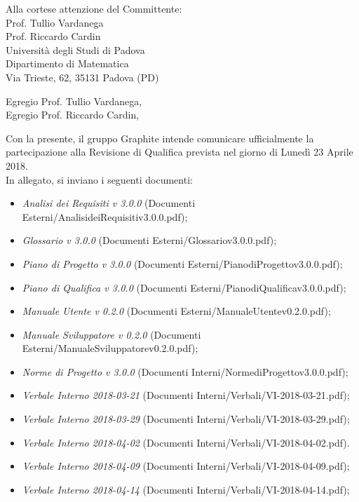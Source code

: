 \documentclass[]{letter}
\begin{document}
\begin{letter}{
		Alla cortese attenzione del Committente: \\
		Prof. Tullio Vardanega \\
		Prof. Riccardo Cardin \\
		Università degli Studi di Padova \\
		Dipartimento di Matematica \\ 
		Via Trieste, 62, 35131 Padova (PD)
	}

\opening{Egregio Prof. Tullio Vardanega, \\ Egregio Prof. Riccardo Cardin,}

\noindent Con la presente, il gruppo Graphite intende comunicare ufficialmente la partecipazione alla Revisione di Qualifica prevista nel giorno di Lunedì 23 Aprile 2018.\\
In allegato, si inviano i seguenti documenti:

\begin{itemize}
	\item \textit{Analisi dei Requisiti v 3.0.0} (Documenti Esterni/AnalisideiRequisitiv3.0.0.pdf);
	\item \textit{Glossario v 3.0.0} (Documenti Esterni/Glossariov3.0.0.pdf);
	\item \textit{Piano di Progetto v 3.0.0} (Documenti Esterni/PianodiProgettov3.0.0.pdf);
	\item \textit{Piano di Qualifica v 3.0.0} (Documenti Esterni/PianodiQualificav3.0.0.pdf);
	\item \textit{Manuale Utente v 0.2.0} (Documenti Esterni/ManualeUtentev0.2.0.pdf);
	\item \textit{Manuale Sviluppatore v 0.2.0} (Documenti Esterni/ManualeSviluppatorev0.2.0.pdf);
	
	\item \textit{Norme di Progetto v 3.0.0} (Documenti Interni/NormediProgettov3.0.0.pdf);
	
	
	\item \textit{Verbale Interno 2018-03-21} (Documenti Interni/Verbali/VI-2018-03-21.pdf);
	\item \textit{Verbale Interno 2018-03-29} (Documenti Interni/Verbali/VI-2018-03-29.pdf);
	\item \textit{Verbale Interno 2018-04-02} (Documenti Interni/Verbali/VI-2018-04-02.pdf).
	\item \textit{Verbale Interno 2018-04-09} (Documenti Interni/Verbali/VI-2018-04-09.pdf);
	\item \textit{Verbale Interno 2018-04-14} (Documenti Interni/Verbali/VI-2018-04-14.pdf);
	

\end{itemize}
\end{letter}
\end{document}
